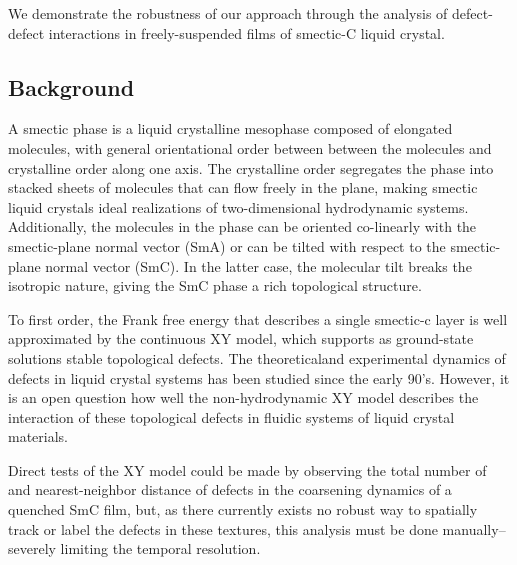 \documentclass[twoside,twocolumn,9pt]{article}
\begin{document}
We demonstrate the robustness of our approach through the analysis of defect-defect interactions in freely-suspended films of smectic-C liquid crystal.

\subsection{Background}
A smectic phase is a liquid crystalline mesophase composed of elongated molecules, with general orientational order between between the molecules and crystalline order along one axis.
The crystalline order segregates the phase into stacked sheets of molecules that can flow freely in the plane, making smectic liquid crystals ideal realizations of two-dimensional hydrodynamic systems. Additionally, the molecules in the phase can be oriented co-linearly with the smectic-plane normal vector (SmA) or can be tilted with respect to the smectic-plane normal vector (SmC). In the latter case, the molecular tilt breaks the isotropic nature, giving the SmC phase a rich topological structure. 

To first order, the Frank free energy that describes a single smectic-c layer is well approximated by the continuous XY model, which supports as ground-state solutions stable topological defects. The theoretical\cite{yurke_coarsening_1993, svensek_hydrodynamics_2002, svensek_hydrodynamics_2003,radzihovsky_anomalous_2015, pleiner_dynamics_1988}and experimental\cite{pargellis_defect_1992, pargellis_planar_1994, oswald_nematic_2005,stannarius_defect_2016} dynamics of defects in liquid crystal systems has been studied since the early 90's. However, it is an open question how well the non-hydrodynamic XY model describes the interaction of these topological defects in fluidic systems of liquid crystal materials.

Direct tests of the XY model could be made by observing the total number of and nearest-neighbor distance of defects in the coarsening dynamics of a quenched SmC film, but, as there currently exists no robust way to spatially track or label the defects in these textures, this analysis must be done manually-- severely limiting the temporal resolution.
\end{document}
